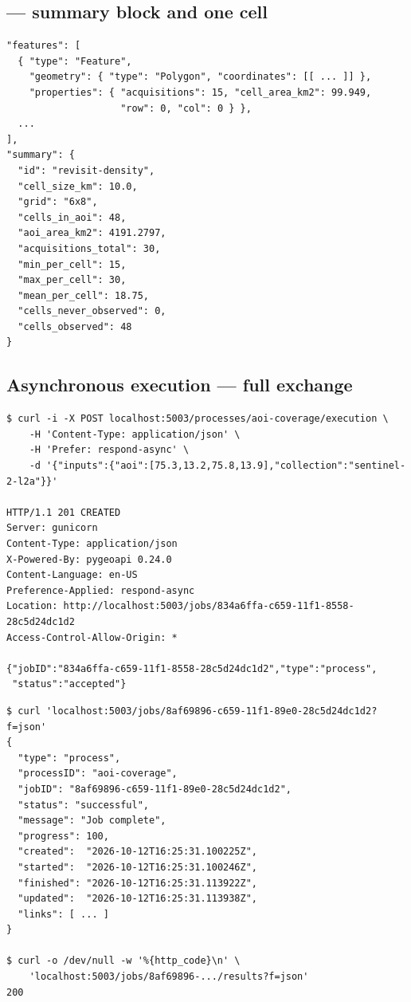 \subsection{ --- summary block and one cell}

\begin{lstlisting}[style=json]
"features": [
  { "type": "Feature",
    "geometry": { "type": "Polygon", "coordinates": [[ ... ]] },
    "properties": { "acquisitions": 15, "cell_area_km2": 99.949,
                    "row": 0, "col": 0 } },
  ...
],
"summary": {
  "id": "revisit-density",
  "cell_size_km": 10.0,
  "grid": "6x8",
  "cells_in_aoi": 48,
  "aoi_area_km2": 4191.2797,
  "acquisitions_total": 30,
  "min_per_cell": 15,
  "max_per_cell": 30,
  "mean_per_cell": 18.75,
  "cells_never_observed": 0,
  "cells_observed": 48
}
\end{lstlisting}

\subsection{Asynchronous execution --- full exchange}

\begin{lstlisting}
$ curl -i -X POST localhost:5003/processes/aoi-coverage/execution \
    -H 'Content-Type: application/json' \
    -H 'Prefer: respond-async' \
    -d '{"inputs":{"aoi":[75.3,13.2,75.8,13.9],"collection":"sentinel-2-l2a"}}'

HTTP/1.1 201 CREATED
Server: gunicorn
Content-Type: application/json
X-Powered-By: pygeoapi 0.24.0
Content-Language: en-US
Preference-Applied: respond-async
Location: http://localhost:5003/jobs/834a6ffa-c659-11f1-8558-28c5d24dc1d2
Access-Control-Allow-Origin: *

{"jobID":"834a6ffa-c659-11f1-8558-28c5d24dc1d2","type":"process",
 "status":"accepted"}
\end{lstlisting}

\begin{lstlisting}[style=json]
$ curl 'localhost:5003/jobs/8af69896-c659-11f1-89e0-28c5d24dc1d2?f=json'
{
  "type": "process",
  "processID": "aoi-coverage",
  "jobID": "8af69896-c659-11f1-89e0-28c5d24dc1d2",
  "status": "successful",
  "message": "Job complete",
  "progress": 100,
  "created":  "2026-10-12T16:25:31.100225Z",
  "started":  "2026-10-12T16:25:31.100246Z",
  "finished": "2026-10-12T16:25:31.113922Z",
  "updated":  "2026-10-12T16:25:31.113938Z",
  "links": [ ... ]
}

$ curl -o /dev/null -w '%{http_code}\n' \
    'localhost:5003/jobs/8af69896-.../results?f=json'
200
\end{lstlisting}

